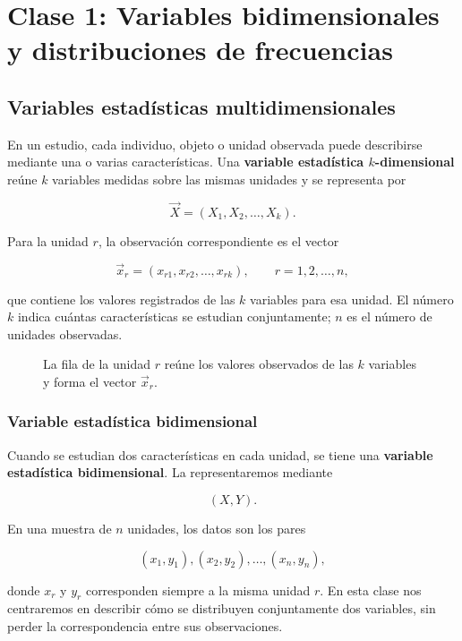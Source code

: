 \chapter{Clase 1: Variables bidimensionales y distribuciones de frecuencias}

\section{Variables estadísticas multidimensionales}

En un estudio, cada individuo, objeto o unidad observada puede describirse mediante una o varias características. Una \textbf{variable estadística $k$-dimensional} reúne $k$ variables medidas sobre las mismas unidades y se representa por

\begin{equation*}
\vec{X}=(X_1,X_2,\ldots,X_k).
\end{equation*}

Para la unidad $r$, la observación correspondiente es el vector

\begin{equation*}
\vec{x}_r=(x_{r1},x_{r2},\ldots,x_{rk}),\qquad r=1,2,\ldots,n,
\end{equation*}

que contiene los valores registrados de las $k$ variables para esa unidad. El número $k$ indica cuántas características se estudian conjuntamente; $n$ es el número de unidades observadas.

\begin{figure}[H]
\centering

\caption{La fila de la unidad $r$ reúne los valores observados de las $k$ variables y forma el vector $\vec{x}_r$.}
\label{fig:variable-k-dimensional}
\end{figure}

\subsection{Variable estadística bidimensional}

Cuando se estudian dos características en cada unidad, se tiene una \textbf{variable estadística bidimensional}. La representaremos mediante

$$
(X,Y).
$$

En una muestra de $n$ unidades, los datos son los pares

$$
(x_1,y_1),(x_2,y_2),\ldots,(x_n,y_n),
$$

donde $x_r$ y $y_r$ corresponden siempre a la misma unidad $r$. En esta clase nos centraremos en describir cómo se distribuyen conjuntamente dos variables, sin perder la correspondencia entre sus observaciones.

